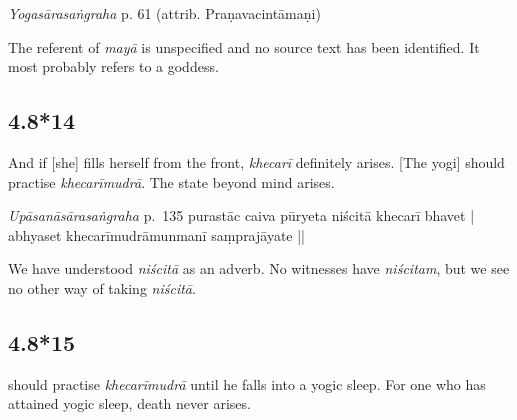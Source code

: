 \begin{ekdosis}

\begin{testimonia}[hp04_008_13]
\emph{Yogasārasaṅgraha} p. 61 (attrib. Praṇavacintāmaṇi)
\begin{versinnote}
\end{versinnote}
\end{testimonia}

\begin{philcomm}[hp04_008_13]
The referent of \emph{mayā} is unspecified and no source text has been identified. It most probably refers to a goddess.%
\end{philcomm}

\subsection*{4.8*14}
\begin{translation}[hp04_008_14]
And if [she] fills herself from the front, \emph{khecarī} definitely arises. [The yogi] should practise \emph{khecarīmudrā}. The state beyond mind arises.
\end{translation}


\begin{testimonia}[hp04_008_14]
\emph{Upāsanāsārasaṅgraha} p.~135
purastāc caiva pūryeta niścitā khecarī bhavet |
abhyaset khecarīmudrāmunmanī saṃprajāyate ||
\end{testimonia}

\begin{philcomm}[hp04_008_14]
We have understood \emph{niścitā} as an adverb. No witnesses have \emph{niścitam}, but we see no other way of taking \emph{niścitā}.
\end{philcomm}

\subsection*{4.8*15}
\begin{translation} should practise \emph{khecarīmudrā} until he falls into a yogic sleep. For one who has attained yogic sleep, death never arises.
\end{translation}


\end{ekdosis}
